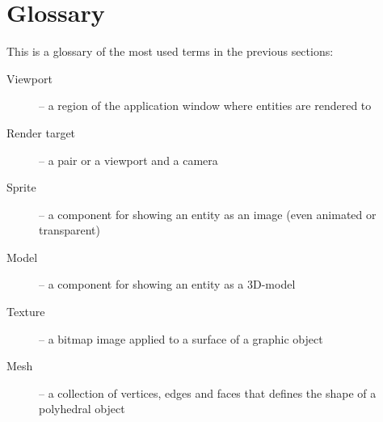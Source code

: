 \section{Glossary}
This is a glossary of the most used terms in the previous sections:

\begin{description}
  \item[Viewport] -- a region of the application window where entities are rendered to
  \item[Render target] -- a pair or a viewport and a camera
  \item[Sprite] -- a component for showing an entity as an image (even animated or transparent)
  \item[Model] -- a component for showing an entity as a 3D-model
  \item[Texture] -- a bitmap image applied to a surface of a graphic object
  \item[Mesh] -- a collection of vertices, edges and faces that defines the shape of a polyhedral object
\end{description}
